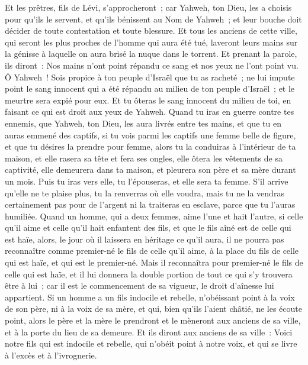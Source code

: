 \begin{multicols}{2}
Et les prêtres, fils de Lévi, s'approcheront~; car Yahweh, ton Dieu, les a choisis pour qu'ils le servent, et qu'ils bénissent au Nom de Yahweh~; et leur bouche doit décider de toute contestation et toute blessure.
Et tous les anciens de cette ville, qui seront les plus proches de l'homme qui aura été tué, laveront leurs mains sur la génisse à laquelle on aura brisé la nuque dans le torrent.
Et prenant la parole, ils diront~: Nos mains n'ont point répandu ce sang et nos yeux ne l'ont point vu.
Ô Yahweh~! Sois propice à ton peuple d'Israël que tu as racheté~; ne lui impute point le sang innocent qui a été répandu au milieu de ton peuple d'Israël~; et le meurtre sera expié pour eux.
Et tu ôteras le sang innocent du milieu de toi, en faisant ce qui est droit aux yeux de Yahweh.
Quand tu iras en guerre contre tes ennemis, que Yahweh, ton Dieu, les aura livrés entre tes mains, et que tu en auras emmené des captifs,
si tu vois parmi les captifs une femme belle de figure, et que tu désires la prendre pour femme,
alors tu la conduiras à l'intérieur de ta maison, et elle rasera sa tête et fera ses ongles,
elle ôtera les vêtements de sa captivité, elle demeurera dans ta maison, et pleurera son père et sa mère durant un mois. Puis tu iras vers elle, tu l'épouseras, et elle sera ta femme.
S'il arrive qu'elle ne te plaise plus, tu la renverras où elle voudra, mais tu ne la vendras certainement pas pour de l'argent ni la traiteras en esclave, parce que tu l'auras humiliée.
Quand un homme, qui a deux femmes, aime l'une et hait l'autre, si celle qu'il aime et celle qu'il hait enfantent des fils, et que le fils aîné est de celle qui est haïe,
alors, le jour où il laissera en héritage ce qu'il aura, il ne pourra pas reconnaître comme premier-né le fils de celle qu'il aime, à la place du fils de celle qui est haïe, et qui est le premier-né.
Mais il reconnaîtra pour premier-né le fils de celle qui est haïe, et il lui donnera la double portion de tout ce qui s'y trouvera être à lui~; car il est le commencement de sa vigueur, le droit d'aînesse lui appartient.
Si un homme a un fils indocile et rebelle, n'obéissant point à la voix de son père, ni à la voix de sa mère, et qui, bien qu'ils l'aient châtié, ne les écoute point,
alors le père et la mère le prendront et le mèneront aux anciens de sa ville, et à la porte du lieu de sa demeure.
Et ils diront aux anciens de sa ville~: Voici notre fils qui est indocile et rebelle, qui n'obéit point à notre voix, et qui se livre à l'excès et à l'ivrognerie.

\end{multicols}
